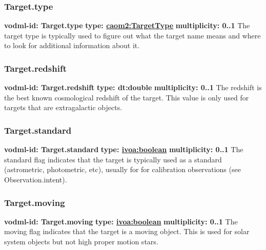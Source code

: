     \subsubsection{Target.type}
      \textbf{vodml-id: Target.type} \newline
      \textbf{type: \hyperref[sect:TargetType]{caom2:TargetType}} \newline
      \textbf{multiplicity: 0..1} \newline
      The target type is typically used to figure out what the target name means and where to look for additional information about it.

    \subsubsection{Target.redshift}
      \textbf{vodml-id: Target.redshift} \newline
      \textbf{type: dt:double} \newline
      \textbf{multiplicity: 0..1} \newline
      The redshift is the best known cosmological redshift of the target. This value is only used for targets that are extragalactic objects.

    \subsubsection{Target.standard}
      \textbf{vodml-id: Target.standard} \newline
      \textbf{type: \hyperref[sect:ivoa]{ivoa:boolean}} \newline
      \textbf{multiplicity: 0..1} \newline
      The standard flag indicates that the target is typically used as a standard (astrometric, photometric, etc), usually for for calibration observations (see Observation.intent).

    \subsubsection{Target.moving}
      \textbf{vodml-id: Target.moving} \newline
      \textbf{type: \hyperref[sect:ivoa]{ivoa:boolean}} \newline
      \textbf{multiplicity: 0..1} \newline
      The moving flag indicates that the target is a moving object. This is used for solar system objects but not high proper motion stars.

